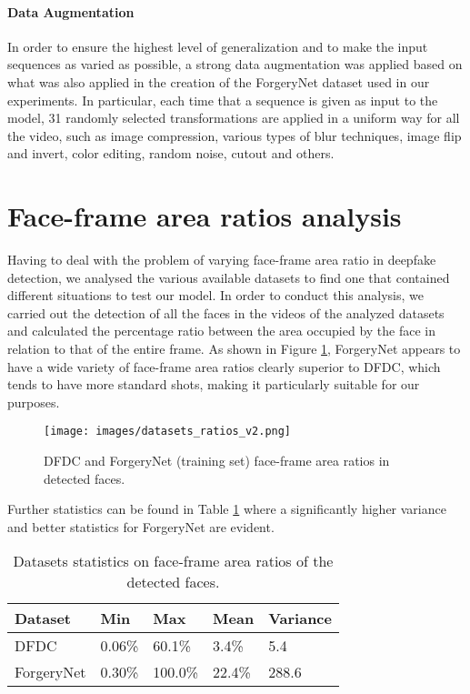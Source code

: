 \documentclass[10pt,twocolumn,letterpaper]{article}
\begin{document}
\paragraph{Data Augmentation} In order to ensure the highest level of generalization and to make the input sequences as varied as possible, a strong data augmentation was applied based on what was also applied in the creation of the ForgeryNet dataset used in our experiments. In particular, each time that a sequence is given as input to the model, 31 randomly selected transformations are applied in a uniform way for all the video, such as image compression, various types of blur techniques, image flip and invert, color editing, random noise, cutout and others. 

\section{Face-frame area ratios analysis}
Having to deal with the problem of varying face-frame area ratio in deepfake detection, we analysed the various available datasets to find one that contained different situations to test our model. In order to conduct this analysis, we carried out the detection of all the faces in the videos of the analyzed datasets and calculated the percentage ratio between the area occupied by the face in relation to that of the entire frame. As shown in Figure \ref{fig:ratios}, ForgeryNet\cite{forgerynet} appears to have a wide variety of face-frame area ratios clearly superior to DFDC\cite{DFDC}, which tends to have more standard shots, making it particularly suitable for our purposes.
\begin{figure}[t]
    \centering
    \texttt{[image: images/datasets\_ratios\_v2.png]}
    \caption{DFDC and ForgeryNet (training set) face-frame area ratios in detected faces.}
    \label{fig:ratios}
\end{figure}
Further statistics can be found in Table \ref{tab:datasets_statistics} where a significantly higher variance and better statistics for ForgeryNet are evident.
\begin{table}[]
    \centering
    \begin{tabular}{lllll}
    \hline
        Dataset & Min & Max & Mean & Variance \\
        \hline
         DFDC & 0.06\% & 60.1\% & 3.4\% & 5.4 \\
         ForgeryNet & 0.30\% & 100.0\% & 22.4\% & 288.6 \\
         \hline
    \end{tabular}
    \caption{Datasets statistics on face-frame area ratios of the detected faces.}
    \label{tab:datasets_statistics}
\end{table}
\end{document}
